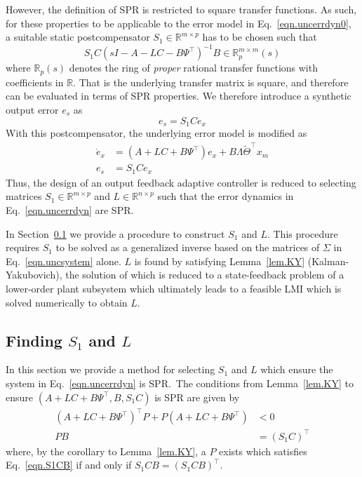 \documentclass[]{../sty/JGCD}
\theoremstyle{examplestyle}
\begin{document}
  However, the definition of SPR is restricted to square transfer functions.
  As such, for these properties to be applicable to the error model in Eq.\ \eqref{eqn.uncerrdyn0}, a suitable static postcompensator $S_1\in\mathbb{R}^{m\times p}$ has to be chosen such that
  \begin{equation*}
    S_{1}C(sI-A-LC-B\Psi^{\top})^{-1}B \in\mathbb{R}_{p}^{m\times m}(s)
  \end{equation*}
  where $\mathbb{R}_{p}(s)$ denotes the ring of \textit{proper} rational transfer functions with coefficients in $\mathbb{R}$.
  That is the underlying transfer matrix is square, and therefore can be evaluated in terms of SPR properties.
  We therefore introduce a synthetic output error $e_s$ as
  \begin{equation*}
    e_{s}=S_{1}Ce_{x}
  \end{equation*}
  With this postcompensator, the underlying error model is modified as
  \begin{equation}
    \label{eqn.uncerrdyn}
    \begin{split}
      \dot{e}_{x}&=(A+LC+B\Psi^{\top})e_{x}+B\Lambda\widetilde{\Theta}^{\top}x_{m} \\
      e_{s}&=S_{1}Ce_{x}
    \end{split}
  \end{equation}
  Thus, the design of an output feedback adaptive controller is reduced to selecting matrices $S_{1}\in\mathbb{R}^{m\times p}$ and $L\in\mathbb{R}^{n\times p}$ such that the error dynamics in Eq.\ \eqref{eqn.uncerrdyn} are SPR.\@

  In Section~\ref{sec.findingS1andL} we provide a procedure to construct $S_{1}$ and $L$.
  This procedure requires $S_{1}$ to be solved as a generalized inverse based on the matrices of $\Sigma$ in Eq.\ \eqref{eqn.uncsystem} alone.
  $L$ is found by satisfying Lemma~\ref{lem.KY} (Kalman-Yakubovich), the solution of which is reduced to a state-feedback problem of a lower-order plant subsystem which ultimately leads to a feasible LMI which is solved numerically to obtain $L$.

  \subsection{Finding $S_{1}$ and $L$}\label{sec.findingS1andL}

  In this section we provide a method for selecting $S_{1}$ and $L$ which ensure the system in Eq.\ \eqref{eqn.uncerrdyn} is SPR.\
  The conditions from Lemma~\ref{lem.KY} to ensure $(A+LC+B\Psi^{\top},B,S_{1}C)$ is SPR are given by
  \begin{align}
    \label{eqn.lyapal}
    (A+LC+B\Psi^{\top})^{\top}P+P(A+LC+B\Psi^{\top})&<0 \\
    \label{eqn.S1CB}
    PB&=(S_{1}C)^{\top}
  \end{align}
  where, by the corollary to Lemma~\ref{lem.KY}, a $P$ exists which satisfies Eq.\ \eqref{eqn.S1CB} if and only if $S_{1}CB=(S_{1}CB)^{\top}$.
\end{document}

